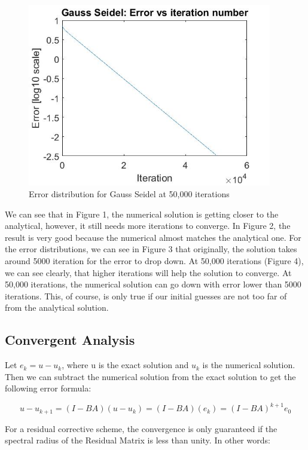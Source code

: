 \documentclass{article}
\begin{document}
	\begin{figure}[H]
		\includegraphics[width=\linewidth,height=80mm]{GS_error_50k.jpg}	
		
		\caption{Error distribution for Gauss Seidel at 50,000 iterations}
	\end{figure}

	\noindent
	We can see that in Figure 1, the numerical solution is getting closer to the analytical, however, it still needs more iterations to converge. In Figure 2, the result is very good because the numerical almost matches the analytical one. For the error distributions, we can see in Figure 3 that originally, the solution takes around 5000 iteration for the error to drop down.  At 50,000 iterations (Figure 4), we can see clearly, that higher iterations will help the solution to converge. At 50,000 iterations, the numerical solution can go down with error lower than 5000 iterations. This, of course, is only true if our initial guesses are not too far of from the analytical solution.
	
	  	

\subsection{Convergent Analysis}

Let $e_{k} = u - u_k$, where u is the exact solution and $u_k$ is the numerical solution. Then we can subtract the numerical solution from the exact solution to get the following error formula: 

\begin{equation}
u - u_{k+1} = (I-BA)(u-u_k) = (I-BA)(e_k) = (I-BA)^{k+1}e_0
\end{equation}

\noindent
For a residual corrective scheme, the convergence is only guaranteed if the spectral radius of the Residual Matrix is less than unity.  In other words: 
\end{document}
